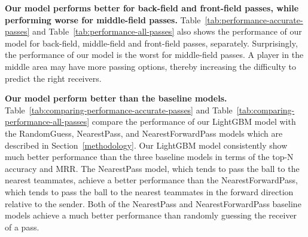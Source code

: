 \textbf{Our model performs better for back-field and front-field passes, while performing worse for middle-field passes.}
Table~\ref{tab:performance-accurate-passes} and Table~\ref{tab:performance-all-passes} also shows the performance of our model for back-field, middle-field and front-field passes, separately.
Surprisingly, the performance of our model is the worst for middle-field passes. A player in the middle area may have more passing options, thereby increasing the difficulty to predict the right receivers.

\textbf{Our model perform better than the baseline models.}
Table~\ref{tab:comparing-performance-accurate-passes} and Table~\ref{tab:comparing-performance-all-passes} compare the performance of our LightGBM model with the RandomGuess, NearestPass, and NearestForwardPass models which are described in Section~\ref{methodology}.
Our LightGBM model consistently show much better performance than the three baseline models in terms of the top-N accuracy and MRR.
The NearestPass model, which tends to pass the ball to the nearest teammates, achieve a better performance than the NearestForwardPass, which tends to pass the ball to the nearest teammates in the forward direction relative to the sender.
Both of the NearestPass and NearestForwardPass baseline models achieve a much better performance than randomly guessing the receiver of a pass.

